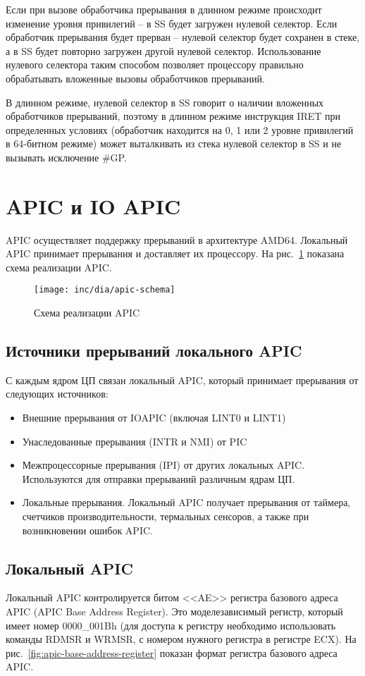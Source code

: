Если при вызове обработчика прерывания в длинном режиме происходит изменение
уровня привилегий -- в SS будет загружен нулевой селектор. Если обработчик
прерывания будет прерван -- нулевой селектор будет сохранен в стеке, а в SS
будет повторно загружен другой нулевой селектор. Использование нулевого
селектора таким способом позволяет процессору правильно обрабатывать вложенные
вызовы обработчиков прерываний.

В длинном режиме, нулевой селектор в SS говорит о наличии вложенных обработчиков прерываний, поэтому
в длинном режиме инструкция IRET при определенных условиях (обработчик находится на 0, 1 или 2 уровне
привилегий в 64-битном режиме)  может выталкивать из стека нулевой селектор в SS и не вызывать исключение \#GP.



\section{APIC и IO APIC}
APIC осуществляет поддержку прерываний в архитектуре AMD64. Локальный APIC принимает прерывания и
доставляет их процессору. На рис.~\ref{fig:apic-schema} показана схема реализации APIC.

\begin{figure}[ht!]
  \centering
  \texttt{[image: inc/dia/apic-schema]}
  \caption{Схема реализации APIC}
  \label{fig:apic-schema}
\end{figure}

\subsection{Источники прерываний локального APIC}
С каждым ядром ЦП связан локальный APIC, который принимает прерывания от следующих источников:
\begin{itemize}
	\item Внешние прерывания от IOAPIC (включая LINT0 и LINT1)
	\item Унаследованные прерывания (INTR и NMI) от PIC
	\item Межпроцессорные прерывания (IPI) от других локальных APIC. Используются
		для отправки прерываний различным ядрам ЦП.
	\item Локальные прерывания. Локальный APIC получает прерывания от таймера,
		счетчиков производительности, термальных сенсоров, а также при возникновении
		ошибок APIC.
\end{itemize}

\subsection{Локальный APIC}
Локальный APIC контролируется битом <<AE>> регистра базового адреса APIC (APIC Base Address Register).
Это моделезависимый регистр, который имеет номер 0000\_001Bh (для доступа к регистру необходимо
использовать команды RDMSR и WRMSR, с номером нужного регистра в регистре ECX).
На рис.~\ref{fig:apic-base-address-register} показан формат регистра базового адреса APIC.

